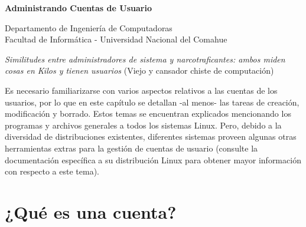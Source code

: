﻿

\usepackage{fancyhdr}
        \pagestyle{fancy}
\usepackage{lastpage}
        \lhead{}
        \chead{}
        \rhead{}
        \cfoot{}
        \renewcommand{\headrulewidth}{0.0pt}
        \renewcommand{\footrulewidth}{0.4pt}

\def\ti#1#2{\texttt{#1} & #2 \\ }





\setlength{\parindent}{0pt}


\makeatletter
{\color{bl} \centering \huge \sc \textbf{
Administrando Cuentas de Usuario \\
\vspace*{8pt} }\par}
\makeatother


\makeatletter
{\centering \small 
        Departamento de Ingeniería de Computadoras \\
        Facultad de Informática - Universidad Nacional del Comahue \\
        \vspace{20pt} }
\makeatother





\textit{Similitudes entre administradores de sistema y
narcotraficantes: ambos miden cosas en Kilos y tienen usuarios} (Viejo y
cansador chiste de computación)

Es necesario familiarizarse con varios aspectos relativos a las
cuentas de los usuarios, por lo que en este capítulo se detallan 
-al menos- las tareas de creación, modificación y borrado.
Estos temas se encuentran explicados
mencionando los programas y archivos generales a todos los sistemas Linux.
Pero, debido a la diversidad de distribuciones existentes,
diferentes sistemas proveen algunas otras herramientas extras para la gestión de cuentas de usuario (consulte la documentación
específica a su distribución Linux para obtener mayor información con 
respecto a este tema).

		
\section{ ¿Qué es una cuenta?}

